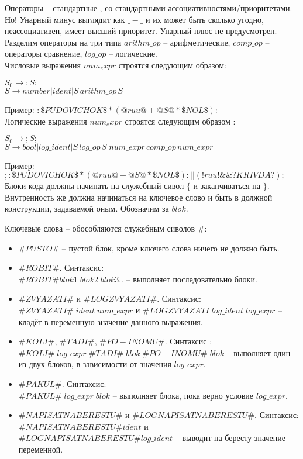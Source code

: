 \documentclass[12pt]{article}
\begin{document}
Операторы -- стандартные , со стандартными ассоциативностями/приоритетами. \\
Но! Унарный минус выглядит как $\_-\_$ и их может быть сколько угодно, неассоциативен, имеет высший приоритет. Унарный плюс не предусмотрен.
Разделим операторы на три типа $arithm\_op$ -- арифметические, $comp\_op$ -- операторы сравнение, $log\_op$ -- логические.\\

Числовые выражения $num_expr$ строятся следующим образом:
\begin{myquote}
$S_0 \to :S:$\\
$S \to number|ident|S\,arithm\_op\,S$
\end{myquote}

Пример: $:\$PUDOVICHOK\$ * (@ruu@ + @S@ * \$NOL\$):$\\

Логические выражения $num_expr$ строятся следующим образом :
\begin{myquote}
$S_0 \to ;S;$\\
$S \to bool|log\_ident|S\,log\_op\,S|num\_expr\,comp\_op\,num\_expr$
\end{myquote}
Пример: $;:\$PUDOVICHOK\$ * (@ruu@ + @S@ * \$NOL\$):||(!ruu! \&\& ?KRIVDA?);$\\


Блоки кода должны начинать на служебный сивол $\{$ и заканчиваться на $\}$. Внутренность же должна начинаться на ключевое слово и быть в должной конструкции, задаваемой оным. Обозначим за $blok$.

Ключевые слова -- обособляются служебным сиволов $\#$:
\begin{itemize}
\item $\#PUSTO\#$ -- пустой блок, кроме ключего слова ничего не должно быть.
\item $\#ROBIT\#$. Синтаксис:\\
$\#ROBIT\#blok1\;blok2\;blok3..$ -- выполняет последовательно блоки.
\item $\#ZVYAZATI\#$ и $\#LOGZVYAZATI\#$. Синтаксис:\\
$\#ZVYAZATI\#\;ident\;num\_expr$ и $\#LOGZVYAZATI\;log\_ident\;log\_expr$ -- кладёт в переменную значение данного выражения.
\item $\#KOLI\#$, $\#TADI\#$, $\#PO-INOMU\#$. Синтаксис :\\
 $\#KOLI\#\;log\_expr\;\#TADI\#\;blok\;\#PO-INOMU\#\; blok$ -- выполняет один из двух блоков, в зависимости от значения $log\_expr$.
\item $\#PAKUL\#$. Синтаксис:\\
$\#PAKUL\#\;log\_expr\;blok$ -- выполняет блока, пока верно условие $log\_expr$.
\item $\#NAPISATNABERESTU\#$ и $\#LOGNAPISATNABERESTU\#$. Синтаксис:\\
$\#NAPISATNABERESTU\# ident$ и $\#LOGNAPISATNABERESTU\# log\_ident$ -- выводит на бересту значение переменной.
\end{itemize}
\end{document}
